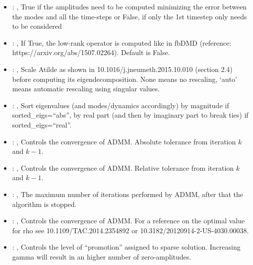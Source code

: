 \begin{itemize}
    \item {}: , 
      True if the amplitudes need to be computed minimizing the error
      between the modes and all the time-steps or False, if only the 1st timestep only needs to be
      considered

    \item {}: , 
      If True, the low-rank operator is computed like in fbDMD (reference:
      https://arxiv.org/abs/1507.02264).                                                  Default is
      False.

    \item {}: , 
      Scale Atilde as shown in 10.1016/j.jneumeth.2015.10.010 (section 2.4) before computing its
      eigendecomposition. None means no rescaling, ‘auto’ means automatic rescaling using singular
      values.

    \item {}: , 
      Sort eigenvalues (and modes/dynamics accordingly) by magnitude if sorted\_eigs=``abs'',
      by real part (and then by imaginary part to break ties) if sorted\_eigs=``real''.

    \item {}: , 
      Controls the convergence of ADMM. Absolute tolerance from iteration $k$ and $k-1$.

    \item {}: , 
      Controls the convergence of ADMM. Relative tolerance from iteration $k$ and $k-1$.

    \item {}: , 
      The maximum number of iterations performed by ADMM, after that the algorithm is stopped.

    \item {}: , 
      Controls the convergence of ADMM. For a reference on the optimal value for rho see
      10.1109/TAC.2014.2354892 or 10.3182/20120914-2-US-4030.00038.

    \item {}: , 
      Controls the level of “promotion” assigned to sparse solution. Increasing gamma will
      result in an higher number of zero-amplitudes.


\end{itemize}

